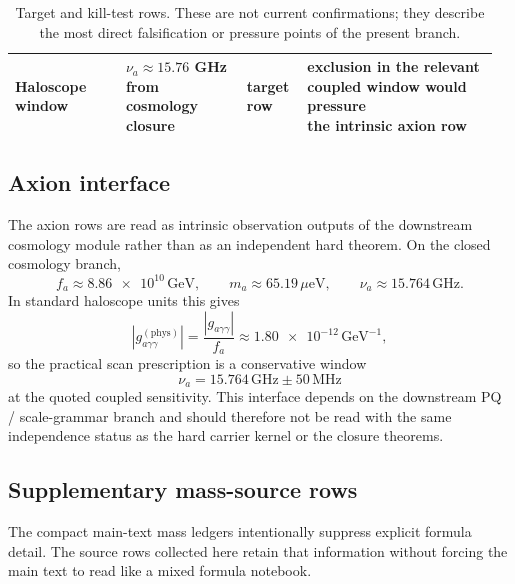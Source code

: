 \begin{table}[H]
{\begin{tabular}{@{}>{\raggedright\arraybackslash}p{0.22\linewidth}>{\raggedright\arraybackslash}p{0.24\linewidth}>{\raggedright\arraybackslash}p{0.12\linewidth}>{\raggedright\arraybackslash}p{0.38\linewidth}@{}}
Haloscope window & \makecell[l]{$\nu_a\approx\num{15.76}$ GHz\\from cosmology closure} & \makecell[l]{target\\row} & \makecell[l]{exclusion in the relevant\\coupled window would pressure\\the intrinsic axion row} \\
\bottomrule
\end{tabular}}
\caption{Target and kill-test rows. These are not current confirmations; they describe the most direct falsification or pressure points of the present branch.}
\label{tab:kill-tests}
\end{table}

\subsection{Axion interface}

The axion rows are read as intrinsic observation outputs of the downstream cosmology module
rather than as an independent hard theorem. On the closed cosmology branch,
\[
f_a\approx \num{8.86e10}\,\mathrm{GeV},
\qquad
m_a\approx \num{65.19}\,\mu\mathrm{eV},
\qquad
\nu_a\approx \num{15.764}\,\mathrm{GHz}.
\]
In standard haloscope units this gives
\[
\left|g_{a\gamma\gamma}^{(\mathrm{phys})}\right|
=
\frac{|g_{a\gamma\gamma}|}{f_a}
\approx
\num{1.80e-12}\,\mathrm{GeV}^{-1},
\]
so the practical scan prescription is a conservative window
\[
\nu_a=\num{15.764}\,\mathrm{GHz}\pm \num{50}\,\mathrm{MHz}
\]
at the quoted coupled sensitivity. This interface depends on the downstream PQ / scale-grammar branch and should therefore not be read with the same independence status as the hard carrier kernel or the closure theorems.

\subsection{Supplementary mass-source rows}

The compact main-text mass ledgers intentionally suppress explicit formula detail. The source rows collected here retain that information without forcing the main text to read like a mixed formula notebook.

